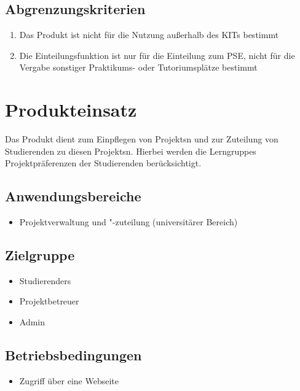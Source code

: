 \documentclass[parskip=full]{scrartcl}
\newcommand{\swtLabel}[1]{\textbf{/#1\arabic*0/}}
\begin{document}
\subsection{Abgrenzungskriterien}
\begin{enumerate}[label=\swtLabel{AG}]
 
  \item Das Produkt ist nicht für die Nutzung außerhalb des KITs bestimmt %

\item Die Einteilungsfunktion ist nur für die Einteilung zum \gls{PSE}, nicht
für die Vergabe sonstiger Praktikums- oder Tutoriumsplätze bestimmt
  
\end{enumerate}
\section{Produkteinsatz}
Das Produkt dient zum Einpflegen von \glspl{Projekt}n und zur Zuteilung von
Studierenden zu diesen \glspl{Projekt}n. Hierbei werden die \glspl{Lerngruppe}
Projektpräferenzen der Studierenden berücksichtigt.


\subsection{Anwendungsbereiche}

\begin{itemize} 
  \item Projektverwaltung und "-zuteilung (universitärer Bereich) %
\end{itemize}

\subsection{Zielgruppe}
\begin{itemize} 
  \item \glspl{Studierender}
  \item \gls{Projektbetreuer}
  \item \gls{Admin}
\end{itemize}

\subsection{Betriebsbedingungen}
\begin{itemize} 
  \item Zugriff über eine Webseite
\end{itemize}
\end{document}
